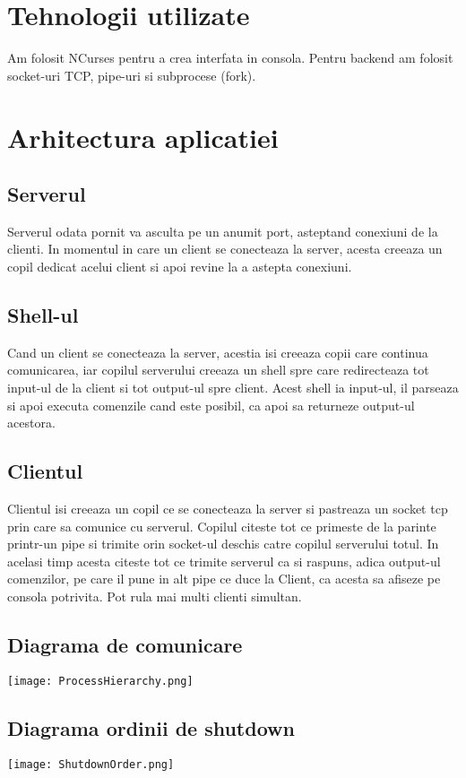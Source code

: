 \documentclass[runningheads]{llncs}
\begin{document}
\newpage
\section{Tehnologii utilizate}
Am folosit NCurses pentru a crea interfata in consola. Pentru backend am folosit socket-uri TCP, pipe-uri si subprocese (fork).

\newpage
\section{Arhitectura aplicatiei}
\subsection{Serverul}
Serverul odata pornit va asculta pe un anumit port, asteptand conexiuni de la clienti. In momentul in care un client se conecteaza la server, acesta creeaza un copil dedicat acelui client si apoi revine la a astepta conexiuni.
\subsection{Shell-ul}
Cand un client se conecteaza la server, acestia isi creeaza copii care continua comunicarea, iar copilul serverului creeaza un shell spre care redirecteaza tot input-ul de la client si tot output-ul spre client. Acest shell ia input-ul, il parseaza si apoi executa comenzile cand este posibil, ca apoi sa returneze output-ul acestora.
\subsection{Clientul}
Clientul isi creeaza un copil ce se conecteaza la server si pastreaza un socket tcp prin care sa comunice cu serverul. Copilul citeste tot ce primeste de la parinte printr-un pipe si trimite orin socket-ul deschis catre copilul serverului totul. In acelasi timp acesta citeste tot ce trimite serverul ca si raspuns, adica output-ul comenzilor, pe care il pune in alt pipe ce duce la Client, ca acesta sa afiseze pe consola potrivita. Pot rula mai multi clienti simultan.
\newpage
\subsection{Diagrama de comunicare}
\begin{center}
\texttt{[image: ProcessHierarchy.png]}
\end{center}
\newpage
\subsection{Diagrama ordinii de shutdown}
\begin{center}
\texttt{[image: ShutdownOrder.png]}
\end{center}
\end{document}
